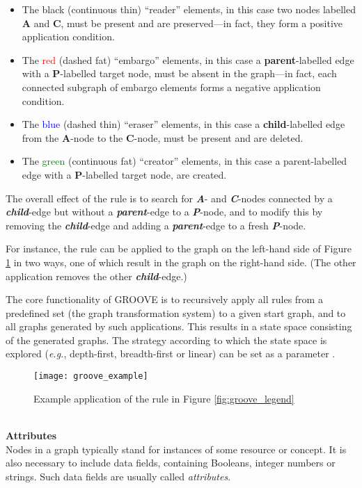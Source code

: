 \begin{itemize}
\item The black (continuous thin) \enquote{reader} elements, in this case two nodes labelled \textbf{A} and \textbf{C}, must be present and are preserved—in fact, they form a positive application condition.
\item The \textcolor{red}{red} (dashed fat) \enquote{embargo} elements, in this case a \textbf{parent}-labelled edge with a \textbf{P}-labelled target node, must be absent in the graph—in fact, each connected subgraph of embargo elements forms a negative application condition.
\item The \textcolor{blue}{blue} (dashed thin) \enquote{eraser} elements, in this case a \textbf{child}-labelled edge from the \textbf{A}-node to the \textbf{C}-node, must be present and are deleted.
\item The \textcolor{green}{green} (continuous fat) \enquote{creator} elements, in this case a parent-labelled edge with a \textbf{P}-labelled target node, are created.
\end{itemize}
The overall effect of the rule is to search for \emph{\textbf{A}}- and \emph{\textbf{C}}-nodes connected by a \emph{\textbf{child}}-edge but without a \emph{\textbf{parent}}-edge to a \emph{\textbf{P}}-node, and to modify this by removing the \emph{\textbf{child}}-edge and adding a \emph{\textbf{parent}}-edge to a fresh \emph{\textbf{P}}-node.

 For instance, the rule can be applied to the graph on the left-hand side of Figure \ref{fig:groove_example}  in two ways, one of which result in the graph on the right-hand side. (The other application removes the other \emph{\textbf{child}}-edge.)

The core functionality of GROOVE is to recursively apply all rules from a predeﬁned set (the graph transformation system) to a given start graph, and to all graphs generated by such applications. This results in a state space consisting of the generated graphs. The strategy according to which the state space is explored (\emph{e.g.}, depth-ﬁrst, breadth-ﬁrst or linear) can be set as a parameter \cite{ghamarian2012modelling}.
\begin{figure}
\center
\texttt{[image: groove\_example]}
\caption{Example application of the rule in Figure \ref{fig:groove_legend}}\label{fig:groove_example}
\end{figure}\\ 
\textbf{Attributes}\\ 
Nodes in a graph typically stand for instances of some resource or concept. It is also necessary to include data ﬁelds, containing Booleans, integer numbers or strings. Such data ﬁelds are usually called \emph{attributes}. 

